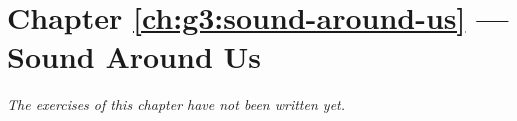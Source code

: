 \section*{Chapter \ref{ch:g3:sound-around-us} --- Sound Around Us}


\emph{The exercises of this chapter have not been written yet.}
